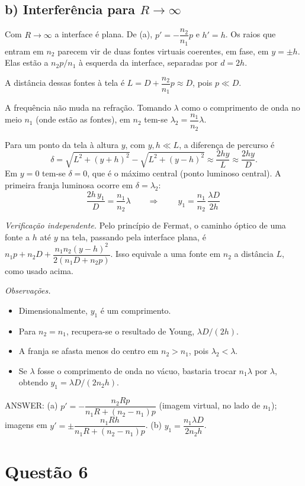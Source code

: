 \documentclass{article}%
\begin{document}
\subsection*{b) Interferência para $R\to\infty$}

Com $R\to\infty$ a interface é plana. De (a), $p'=-\dfrac{n_2}{n_1}p$ e $h'=h$. Os raios que entram em $n_2$ parecem vir de duas fontes virtuais coerentes, em fase, em $y=\pm h$. Elas estão a $n_2p/n_1$ à esquerda da interface, separadas por $d=2h$.

A distância dessas fontes à tela é $L=D+\dfrac{n_2}{n_1}p\approx D$, pois $p\ll D$.

A frequência não muda na refração. Tomando $\lambda$ como o comprimento de onda no meio $n_1$ (onde estão as fontes), em $n_2$ tem-se $\lambda_2=\dfrac{n_1}{n_2}\lambda$.

Para um ponto da tela à altura $y$, com $y,h\ll L$, a diferença de percurso é
\[
\delta=\sqrt{L^2+(y+h)^2}-\sqrt{L^2+(y-h)^2}\approx\frac{2hy}{L}\approx\frac{2hy}{D}.
\]
Em $y=0$ tem-se $\delta=0$, que é o máximo central (ponto luminoso central). A primeira franja luminosa ocorre em $\delta=\lambda_2$:
\[
\frac{2h\,y_1}{D}=\frac{n_1}{n_2}\lambda
\qquad\Longrightarrow\qquad
\boxed{\,y_1=\frac{n_1}{n_2}\,\frac{\lambda D}{2h}\,}
\]

\emph{Verificação independente.} Pelo princípio de Fermat, o caminho óptico de uma fonte a $h$ até $y$ na tela, passando pela interface plana, é $n_1p+n_2D+\dfrac{n_1n_2(y-h)^2}{2(n_1D+n_2p)}$. Isso equivale a uma fonte em $n_2$ a distância $L$, como usado acima.

\emph{Observações.}
\begin{itemize}
\item Dimensionalmente, $y_1$ é um comprimento.
\item Para $n_2=n_1$, recupera-se o resultado de Young, $\lambda D/(2h)$.
\item A franja se afasta menos do centro em $n_2>n_1$, pois $\lambda_2<\lambda$.
\item Se $\lambda$ fosse o comprimento de onda no vácuo, bastaria trocar $n_1\lambda$ por $\lambda$, obtendo $y_1=\lambda D/(2n_2h)$.
\end{itemize}

ANSWER: (a) $p'=-\dfrac{n_2Rp}{n_1R+(n_2-n_1)p}$ (imagem virtual, no lado de $n_1$); imagens em $y'=\pm\dfrac{n_1Rh}{n_1R+(n_2-n_1)p}$. (b) $y_1=\dfrac{n_1\lambda D}{2n_2h}$.%
\newpage%
\section*{Questão 6}
\end{document}
